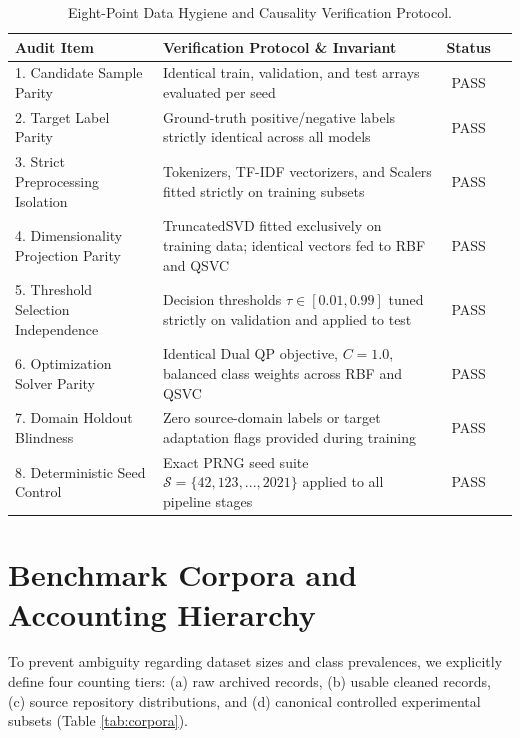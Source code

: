 \documentclass{article}
\begin{document}
\begin{table}[!htbp]
\centering
\small
\caption{Eight-Point Data Hygiene and Causality Verification Protocol.}
\label{tab:audit}
\setlength{\tabcolsep}{5pt}
\begin{tabularx}{\textwidth}{p{4.2cm}Xcc}
\toprule
Audit Item & Verification Protocol \& Invariant & Status \\
\midrule
1. Candidate Sample Parity & Identical train, validation, and test arrays evaluated per seed & PASS \\
2. Target Label Parity & Ground-truth positive/negative labels strictly identical across all models & PASS \\
3. Strict Preprocessing Isolation & Tokenizers, TF-IDF vectorizers, and Scalers fitted strictly on training subsets & PASS \\
4. Dimensionality Projection Parity & TruncatedSVD fitted exclusively on training data; identical vectors fed to RBF and QSVC & PASS \\
5. Threshold Selection Independence & Decision thresholds $\tau \in [0.01, 0.99]$ tuned strictly on validation and applied to test & PASS \\
6. Optimization Solver Parity & Identical Dual QP objective, $C=1.0$, balanced class weights across RBF and QSVC & PASS \\
7. Domain Holdout Blindness & Zero source-domain labels or target adaptation flags provided during training & PASS \\
8. Deterministic Seed Control & Exact PRNG seed suite $\mathcal{S} = \{42, 123, ..., 2021\}$ applied to all pipeline stages & PASS \\
\bottomrule
\end{tabularx}
\end{table}

\section{Benchmark Corpora and Accounting Hierarchy}
\label{sec:corpora}

To prevent ambiguity regarding dataset sizes and class prevalences, we explicitly define four counting tiers: (a) raw archived records, (b) usable cleaned records, (c) source repository distributions, and (d) canonical controlled experimental subsets (Table \ref{tab:corpora}).
\end{document}
